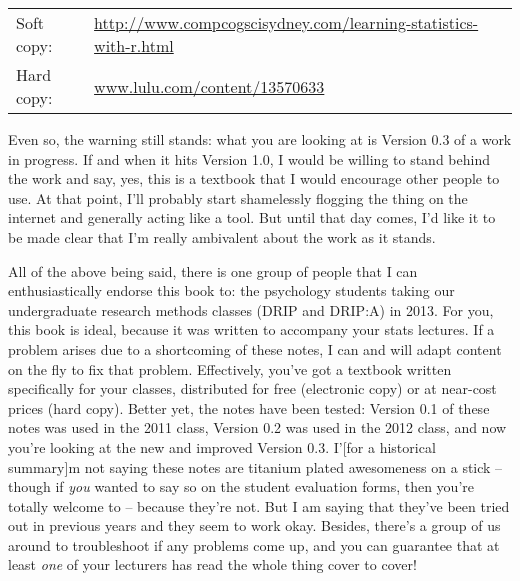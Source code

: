 \noindent
\begin{tabular}{ll}
Soft copy: &\url{http://www.compcogscisydney.com/learning-statistics-with-r.html}\\
Hard copy: & \url{www.lulu.com/content/13570633} 
\end{tabular}
\vsp

Even so, the warning still stands: what you are looking at is Version 0.3 of a work in progress. If and when it hits Version 1.0, I would be willing to stand behind the work and say, yes, this is a textbook that I would encourage other people to use. At that point, I'll probably start shamelessly flogging the thing on the internet and generally acting like a tool. But until that day comes, I'd like it to be made clear that I'm really ambivalent about the work as it stands. \vsp

All of the above being said, there is one group of people that I can enthusiastically endorse this book to: the psychology students taking our undergraduate research methods classes (DRIP and DRIP:A) in 2013. For you, this book is ideal, because it was written to accompany your stats lectures. If a problem arises due to a shortcoming of these notes, I can and will adapt content on the fly to fix that problem. Effectively, you've got a textbook written specifically for your classes, distributed for free (electronic copy) or at near-cost prices (hard copy). Better yet, the notes have been tested: Version 0.1 of these notes was used in the 2011 class, Version 0.2 was used in the 2012 class, and now you're looking at the new and improved Version 0.3. I'[for a historical summary]m not saying these notes are titanium plated awesomeness on a stick -- though if {\it you} wanted to say so on the student evaluation forms, then you're totally welcome to -- because they're not. But I am saying that they've been tried out in previous years and they seem to work okay. Besides, there's a group of us around to troubleshoot if any problems come up, and you can guarantee that at least {\it one} of your lecturers has read the whole thing cover to cover! \vsp

